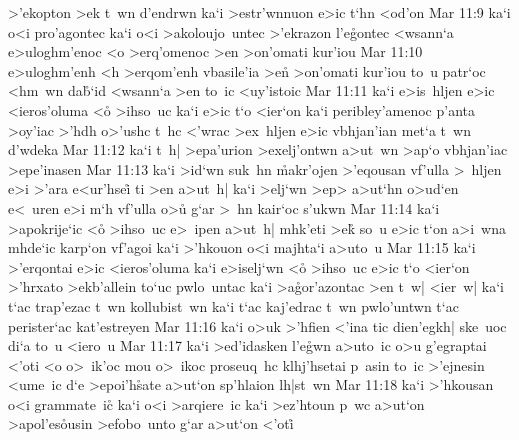 >'ekopton
>ek
t~wn
d'endrwn
ka`i
>estr'wnnuon
e>ic
t`hn
<od'on\bibvsend
\vs Mar 11:9
ka`i
o<i
pro'agontec
ka`i
o<i
>akoloujo~untec
>'ekrazon
l'e\r{g}ontec
<wsann`a
e>uloghm'enoc
<o
>erq'omenoc
>en
>on'omati
kur'iou\bibvsend
\vs Mar 11:10
e>uloghm'enh
<h
>erqom'enh
vbasile'ia
>e\r{n}
>on'omati
kur'iou
to~u
patr`oc
<hm~wn
da\r{b}`id
<wsann`a
>en
to~ic
<uy'istoic\bibvsend
\vs Mar 11:11
ka`i
e>is~hljen
e>ic
<ieros'oluma
<o\r{}
>ihso~uc
ka`i
e>ic
t`o
<ier`on
ka`i
peribley'amenoc
p'anta
>oy'iac
>'hdh
o>'ushc
t~hc
<'wrac
>ex~hljen
e>ic
vbhjan'ian
met`a
t~wn
d'wdeka\bibvsend
\vs Mar 11:12
ka`i
t~h|
>epa'urion
>exelj'ontwn
a>ut~wn
>ap`o
vbhjan'iac
>epe'inasen\bibvsend
\vs Mar 11:13
ka`i
>id`wn
suk~hn
\r{m}akr'ojen
>'eqousan
vf'ulla
>~hljen
e>i
>'ara
e<ur'hsei\r{}
ti
>en
a>ut~h|
ka`i
>elj`wn
>ep>
a>ut`hn
o>ud`en
e<~uren
e>i
m`h
vf'ulla
o>u\r{}
g`ar
>~hn
kair`oc
s'ukwn\bibvsend
\vs Mar 11:14
ka`i
>apokrije`ic
<o\r{}
>ihso~uc
e>~ipen
a>ut~h|
mhk'eti
>ek\r{}
so~u
e>ic
t`on
a>i~wna
mhde`ic
karp`on
vf'agoi
ka`i
>'hkouon
o<i
majhta`i
a>uto~u\bibvsend
\vs Mar 11:15
ka`i
>'erqontai
e>ic
<ieros'oluma
ka`i
e>iselj`wn
<o\r{}
>ihso~uc
e>ic
t`o
<ier`on
>'hrxato
>ekb'allein
to`uc
pwlo~untac
ka`i
>a\r{g}or'azontac
>en
t~w|
<ier~w|
ka`i
t`ac
trap'ezac
t~wn
kollubist~wn
ka`i
t`ac
kaj'edrac
t~wn
pwlo'untwn
t`ac
perister`ac
kat'estreyen\bibvsend
\vs Mar 11:16
ka`i
o>uk
>'hfien
<'ina
tic
dien'egkh|
ske~uoc
di`a
to~u
<iero~u\bibvsend
\vs Mar 11:17
ka`i
>ed'idasken
l'e\r{g}wn
a>uto~ic
o>u
g'egraptai
<'oti
<o
o>~ik'oc
mou
o>~ikoc
proseuq~hc
klhj'hsetai
p~asin
to~ic
>'ejnesin
<ume~ic
d`e
>epoi'h\r{s}ate
a>ut`on
sp'hlaion
lh|st~wn\bibvsend
\vs Mar 11:18
ka`i
>'hkousan
o<i
grammate~ic\r{}
ka`i
o<i
>arqiere~ic
ka`i
>ez'htoun
p~wc
a>ut`on
>apol'es\r{o}usin
>efobo~unto
g`ar
a>ut`on
<'oti\r{}
